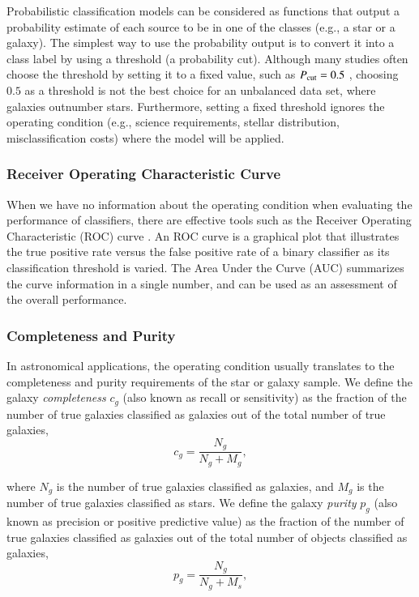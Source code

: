 \documentclass[fleqn,usenatbib]{mnras}
\newcommand{\eg}{{e.g., }}
\begin{document}
Probabilistic classification models can be considered as
functions that output a probability estimate of each source
to be in one of the classes (\eg a star or a galaxy).
The simplest way to use the probability output is to
convert it into a class label by using a threshold (a probability cut).
Although many studies often choose the threshold by setting it to a fixed value,
such as $P_{{\mathrm{cut}}} = 0.5$ \citep[\eg][]{henrion2011bayesian, Fadely2012},
choosing $0.5$ as a threshold is not the best choice
for an unbalanced data set, where galaxies outnumber stars.
Furthermore, setting a fixed threshold ignores the operating condition 
(\eg science requirements, stellar distribution, misclassification costs)
where the model will be applied.


\subsubsection{Receiver Operating Characteristic Curve}

When we have no information about the operating condition
when evaluating the performance of classifiers,
there are effective tools such as
the Receiver Operating Characteristic (ROC) curve
\citep*{swets2000better}.
An ROC curve is a graphical plot that illustrates the true positive rate
versus the false positive rate of a binary classifier
as its classification threshold is varied.
The Area Under the Curve (AUC) summarizes the curve information
in a single number,
and can be used as an assessment of the overall performance.

\subsubsection{Completeness and Purity}

In astronomical applications,
the operating condition usually translates to
the completeness and purity requirements of the star or galaxy sample.
We define the galaxy \textit{completeness}
$c_g$ (also known as recall or sensitivity) as
the fraction of the number of true galaxies classified as galaxies
out of the total number of true galaxies,
\begin{equation}
c_g = \frac{N_g}{N_g + M_g},
\end{equation}

\noindent
where $N_g$ is the number of true galaxies classified as galaxies,
and $M_g$ is the number of true galaxies classified as stars.
We define the galaxy \textit{purity} $p_g$ (also known as precision
or positive predictive value)
as the fraction of the number of true galaxies classified as galaxies
out of the total number of objects classified as galaxies, 
\begin{equation}
p_g = \frac{N_g}{N_g + M_s},
\end{equation}
\end{document}
